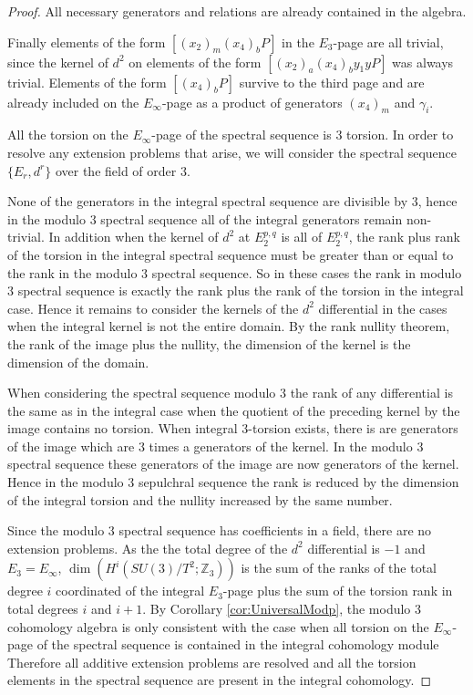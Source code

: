 \documentclass{article}
\theoremstyle{plain}
\theoremstyle{definition}
\numberwithin{thm}{section}
\begin{document}
\begin{proof}
				All necessary generators and relations are already contained in the algebra.
				
				Finally elements of the form $[(x_2)_m(x_4)_bP]$ in the $E_3$-page are all trivial,
				since the kernel of $d^2$ on elements of the form $[(x_2)_a(x_4)_by_1yP]$ was always trivial.
				Elements of the form $[(x_4)_bP]$ survive to the third page and are already included 
				on the $E_\infty$-page
				as a product of generators $(x_4)_m$ and $\gamma_i$.
				
				All the torsion on the $E_\infty$-page of the spectral sequence is $3$ torsion.
				In order to resolve any extension problems that arise, we will consider the spectral sequence $\{ E_r, d^r \}$ over the field of order $3$.
				
				None of the generators in the integral spectral sequence are divisible by $3$,
				hence in the modulo $3$ spectral sequence all of the integral generators remain non-trivial. 
				In addition when the kernel of $d^2$ at $E_2^{p,q}$ is all of $E_2^{p,q}$, the rank plus rank of the torsion in the integral spectral sequence
				must be greater than or equal to the rank in the modulo $3$ spectral sequence.
				So in these cases the rank in modulo $3$ spectral sequence is exactly the rank plus the rank of the torsion in the integral case.
				Hence it remains to consider the kernels of the $d^2$ differential in the cases when the integral kernel is not the entire domain.
				By the rank nullity theorem, the rank of the image plus the nullity, the dimension of the kernel is the dimension of the domain.
				
				When considering the spectral sequence modulo $3$ the rank of any differential is the same as in the integral case
				when the quotient of the preceding kernel by the image contains no torsion.
				When integral $3$-torsion exists, there is are generators of the image which are $3$ times a generators of the kernel.
				In the modulo $3$ spectral sequence these generators of the image are now generators of the kernel.
				Hence in the modulo $3$ sepulchral sequence the rank is reduced by the dimension of the integral torsion and the nullity increased by the same number.
				
				Since the modulo $3$ spectral sequence has coefficients in a field, there are no extension problems.
				As the the total degree of the $d^2$ differential is $-1$ and $E_3=E_\infty$, $\dim(H^i(SU(3)/T^2;\mathbb{Z}_3))$
				is the sum of the ranks of the total degree $i$ coordinated of the integral $E_3$-page plus the sum of the torsion rank in total degrees $i$ and $i+1$.
				By Corollary \ref{cor:UniversalModp}, 
				the modulo $3$ cohomology algebra is only consistent with the case when all torsion on the $E_\infty$-page of the spectral sequence
				is contained in the integral cohomology module
				Therefore all additive extension problems are resolved and all the torsion elements in the spectral sequence are present in the integral cohomology.
			\end{proof}
\end{document}
